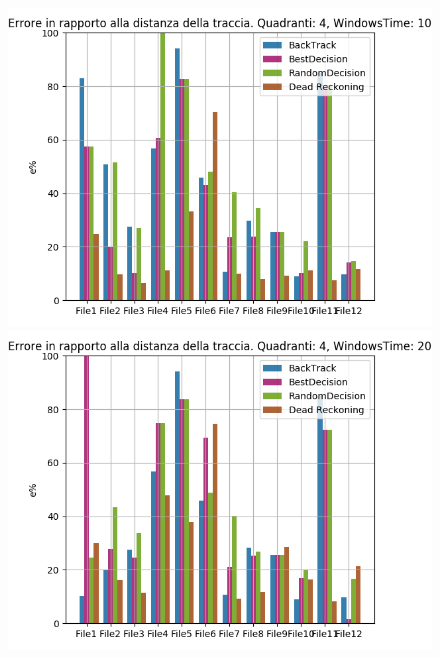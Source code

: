 \documentclass[12pt,a4paper,openright,twoside]{report}
\begin{document}
\begin{figure}[H]
\centering  
\includegraphics[scale=0.4]{firstChart4-10} 
\includegraphics[scale=0.4]{firstChart4-20} 
\end{figure}
\end{document}
